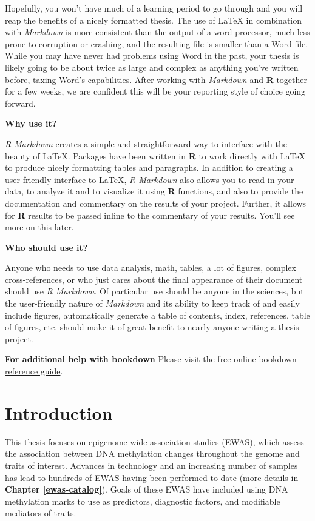 \documentclass[11pt,twoside]{bristolthesis}
\begin{document}
Hopefully, you won't have much of a learning period to go through and you will reap the benefits of a nicely formatted thesis. The use of LaTeX in combination with \emph{Markdown} is more consistent than the output of a word processor, much less prone to corruption or crashing, and the resulting file is smaller than a Word file. While you may have never had problems using Word in the past, your thesis is likely going to be about twice as large and complex as anything you've written before, taxing Word's capabilities. After working with \emph{Markdown} and \textbf{R} together for a few weeks, we are confident this will be your reporting style of choice going forward.

\textbf{Why use it?}

\emph{R Markdown} creates a simple and straightforward way to interface with the beauty of LaTeX. Packages have been written in \textbf{R} to work directly with LaTeX to produce nicely formatting tables and paragraphs. In addition to creating a user friendly interface to LaTeX, \emph{R Markdown} also allows you to read in your data, to analyze it and to visualize it using \textbf{R} functions, and also to provide the documentation and commentary on the results of your project. Further, it allows for \textbf{R} results to be passed inline to the commentary of your results. You'll see more on this later.

\textbf{Who should use it?}

Anyone who needs to use data analysis, math, tables, a lot of figures, complex cross-references, or who just cares about the final appearance of their document should use \emph{R Markdown}. Of particular use should be anyone in the sciences, but the user-friendly nature of \emph{Markdown} and its ability to keep track of and easily include figures, automatically generate a table of contents, index, references, table of figures, etc. should make it of great benefit to nearly anyone writing a thesis project.

\textbf{For additional help with bookdown}
Please visit \href{https://bookdown.org/yihui/bookdown/}{the free online bookdown reference guide}.

\hypertarget{introduction}{%
\chapter{Introduction}\label{introduction}}

This thesis focuses on epigenome-wide association studies (EWAS), which assess the association between DNA methylation changes throughout the genome and traits of interest. Advances in technology and an increasing number of samples has lead to hundreds of EWAS having been performed to date (more details in \textbf{Chapter \ref{ewas-catalog}}). Goals of these EWAS have included using DNA methylation marks to use as predictors, diagnostic factors, and modifiable mediators of traits.
\end{document}
